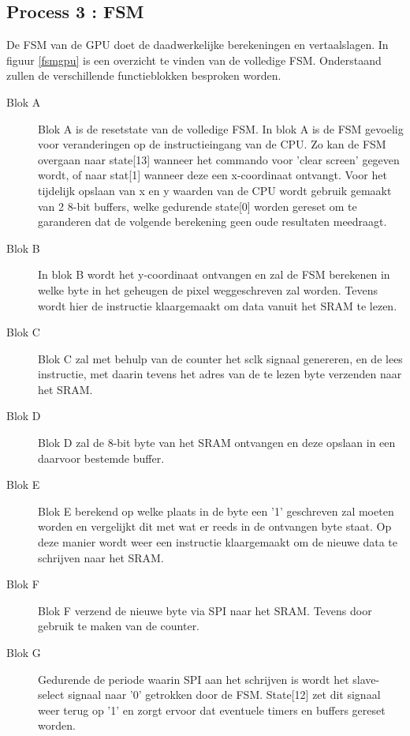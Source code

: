 \documentclass[oneside,dutch]{tudelft-report}
\begin{document}
\subsection{Process 3 : FSM}
De FSM van de GPU doet de daadwerkelijke berekeningen en vertaalslagen. In figuur \ref{fsmgpu} is een overzicht te vinden van de volledige FSM. Onderstaand zullen de verschillende functieblokken besproken worden.
\begin{description}
\item [Blok A]
	Blok A is de resetstate van de volledige FSM. In blok A is de FSM gevoelig voor veranderingen op de instructieingang van de CPU. Zo kan de FSM overgaan naar state[13] wanneer het commando voor 'clear screen' gegeven wordt, of naar stat[1] wanneer deze een x-coordinaat ontvangt. Voor het tijdelijk opslaan van x en y waarden van de CPU wordt gebruik gemaakt van 2 8-bit buffers, welke gedurende state[0] worden gereset om te garanderen dat de volgende berekening geen oude resultaten meedraagt.
\item [Blok B]
In blok B wordt het y-coordinaat ontvangen en zal de FSM berekenen in welke byte in het geheugen de pixel weggeschreven zal worden. Tevens wordt hier de instructie klaargemaakt om data vanuit het SRAM te lezen.
\item [Blok C] 
	Blok C zal met behulp van de counter het sclk signaal genereren, en de lees instructie, met daarin tevens het adres van de te lezen byte verzenden naar het SRAM.
\item [Blok D]
	Blok D zal de 8-bit byte van het SRAM ontvangen en deze opslaan in een daarvoor bestemde buffer.
\item [Blok E]
	Blok E berekend op welke plaats in de byte een '1' geschreven zal moeten worden en vergelijkt dit met wat er reeds in de ontvangen byte staat. Op deze manier wordt weer een instructie klaargemaakt om de nieuwe data te schrijven naar het SRAM.
\item [Blok F]
	Blok F verzend de nieuwe byte via SPI naar het SRAM. Tevens door gebruik te maken van de counter.
\item [Blok G]
	Gedurende de periode waarin SPI aan het schrijven is wordt het slave-select signaal naar '0' getrokken door de FSM. State[12] zet dit signaal weer terug op '1' en zorgt ervoor dat eventuele timers en buffers gereset worden.
\end{description}
\end{document}
